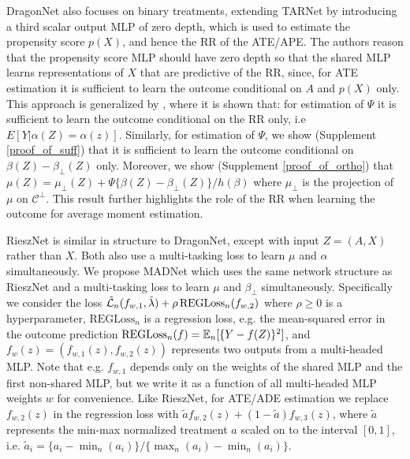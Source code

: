 DragonNet \citep{Shi2019} also focuses on binary treatments, extending TARNet by introducing a third scalar output MLP of zero depth, which is used to estimate the propensity score $p(X)$, and hence the RR of the ATE/APE. The authors reason that the propensity score MLP should have zero depth so that the shared MLP learns representations of $X$ that are predictive of the RR, since, for ATE estimation it is sufficient to learn the outcome conditional on $A$ and $p(X)$ only. This approach is generalized by \citet[Lemma 3.1]{Chernozhukov2022}, where it is shown that: for estimation of $\Psi$ it is sufficient to learn the outcome conditional on the RR only, i.e $E[Y|\alpha(Z) = \alpha(z)]$. Similarly, for estimation of $\Psi$, we show (Supplement \ref{proof_of_suff}) that it is sufficient to learn the outcome conditional on $\beta(Z) - \beta_\perp(Z)$ only. Moreover, we show (Supplement \ref{proof_of_ortho}) that $\mu(Z) = \mu_\perp(Z) + \Psi \{\beta(Z) - \beta_\perp(Z)\} / h(\beta)$
where $\mu_\perp$ is the projection of $\mu$ on $\mathcal{C}^{\perp}$. This result further highlights the role of the RR when learning the outcome for average moment estimation.

RieszNet is similar in structure to DragonNet, except with input $Z = (A, X)$ rather than $X$. Both also use a multi-tasking loss to learn $\mu$ and $\alpha$ simultaneously. We propose MADNet which uses the same network structure as RieszNet and a multi-tasking loss to learn $\mu$ and $\beta_\perp$ simultaneously. Specifically we consider the loss $\Tilde{\mathcal{L}}_n(f_{w, 1}, \Tilde{\lambda}) + \rho\,\text{REGLoss}_n(f_{w, 2})$
where $\rho \geq 0$ is a hyperparameter, $\text{REGLoss}_n$ is a regression loss, e.g. the mean-squared error in the outcome prediction $\text{REGLoss}_n(f) = \mathbb{E}_n[\{Y - f(Z)\}^2]$, and $f_w(z) = (f_{w,1}(z), f_{w,2}(z))$ represents two outputs from a multi-headed MLP. Note that e.g. $f_{w,1}$ depends only on the weights of the shared MLP and the first non-shared MLP, but we write it as a function of all multi-headed MLP weights $w$ for convenience. Like RieszNet, for ATE/ADE estimation we replace $f_{w, 2}(z)$ in the regression loss with $\tilde{a} f_{w, 2}(z) + (1-\tilde{a})f_{w, 3}(z)$, where $\tilde{a}$ represents the min-max normalized treatment $a$ scaled on to the interval $[0, 1]$, i.e. $\tilde{a}_i = \{a_i - \min_n(a_i)\} / \{\max_n(a_i) - \min_n(a_i)\}$.

